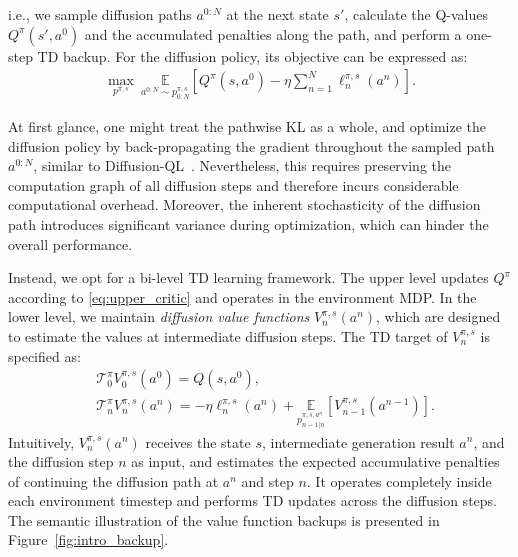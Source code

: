 i.e., we sample diffusion paths $a^{0:N}$ at the next state $s'$, calculate the Q-values $Q^\pi(s', a^0)$ and the accumulated penalties along the path, and perform a one-step TD backup. For the diffusion policy, its objective can be expressed as:
\begin{equation}\label{problem:path_diff}
    \begin{aligned}
        \max_{p^{\pi,s}}\ 
        \underset{{a^{0:N}\sim p^{\pi,s}_{0:N}}}{\mathbb{E}}\left[Q^\pi(s, a^0)-\eta\sum_{n=1}^N\ell^{\pi,s}_{n}(a^n)\right].
    \end{aligned}
\end{equation}

At first glance, one might treat the pathwise KL as a whole, and optimize the diffusion policy by back-propagating the gradient throughout the sampled path $a^{0:N}$, similar to Diffusion-QL~\citep{dql}. Nevertheless, this requires preserving the computation graph of all diffusion steps and therefore incurs considerable computational overhead. Moreover, the inherent stochasticity of the diffusion path introduces significant variance during optimization, which can hinder the overall performance. 

Instead, we opt for a bi-level TD learning framework. The upper level updates $Q^\pi$ according to \eqref{eq:upper_critic} and operates in the environment MDP. In the lower level, we maintain \textit{diffusion value functions} $V^{\pi, s}_n(a^n)$, which are designed to estimate the values at intermediate diffusion steps. The TD target of $V^{\pi,s}_{n}$ is specified as:
\begin{equation}\label{eq:intermediate_value}
    \begin{aligned}
        &\mathcal{T}_0^{\pi}V_0^{\pi,s}(a^0)=Q(s,a^0),\\
        &\mathcal{T}_n^{\pi}V_n^{\pi,s}(a^n)=-\eta \ell^{\pi,s}_n(a^n)+\underset{ p^{\pi,s,a^n}_{n-1|n}}{\mathbb{E}}\left[V_{n-1}^{\pi,s}(a^{n-1})\right].
    \end{aligned}
\end{equation}
Intuitively, $V^{\pi, s}_n(a^n)$ receives the state $s$, intermediate generation result $a^n$, and the diffusion step $n$ as input, and estimates the expected accumulative penalties of continuing the diffusion path at $a^n$ and step $n$. It operates completely inside each environment timestep and performs TD updates across the diffusion steps. The semantic illustration of the value function backups is presented in Figure~\ref{fig:intro_backup}. 

